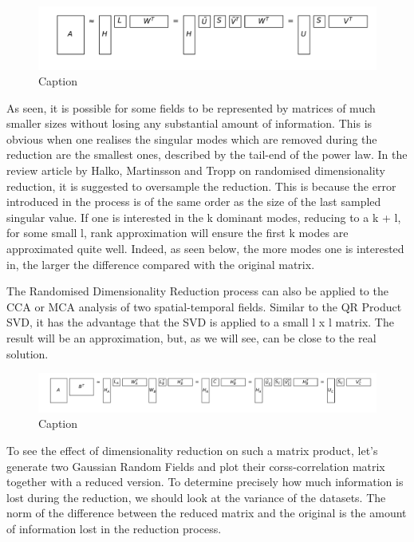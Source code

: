 \documentclass{acm_proc_article-sp}
\begin{document}
\begin{figure}[h]
\begin{center}
\includegraphics[scale=0.25]{Results/reduceSizeRandomisedSquare.pdf}
\caption[Small caption]{Caption}
\label{fig:reduceSizeRandomisedSquare}
\end{center}
\end{figure}

As seen, it is possible for some fields to be represented by matrices of much smaller sizes without losing any substantial amount of information. This is obvious when one realises the singular modes which are removed during the reduction are the smallest ones, described by the tail-end of the power law. In the review article by Halko, Martinsson and Tropp on randomised dimensionality reduction, it is suggested to oversample the reduction. This is because the error introduced in the process is of the same order as the size of the last sampled singular value. If one is interested in the k dominant modes, reducing to a k + l, for some small l, rank approximation will ensure the first k modes are approximated quite well. Indeed, as seen below, the more modes one is interested in, the larger the difference compared with the original matrix.

The Randomised Dimensionality Reduction process can also be applied to the CCA or MCA analysis of two spatial-temporal fields. Similar to the QR Product SVD, it has the advantage that the SVD is applied to a small l x l matrix. The result will be an approximation, but, as we will see, can be close to the real solution.

\begin{figure}[h]
\begin{center}
\includegraphics[scale=0.2]{Results/randomisedSquareProductSVD.pdf}
\caption[Small caption]{Caption}
\label{fig:randomisedSquareProductSVD}
\end{center}
\end{figure}

To see the effect of dimensionality reduction on such a matrix product, let's generate two Gaussian Random Fields and plot their corss-correlation matrix together with a reduced version. To determine precisely how much information is lost during the reduction, we should look at the variance of the datasets. The norm of the difference between the reduced matrix and the original is the amount of information lost in the reduction process.
\end{document}
